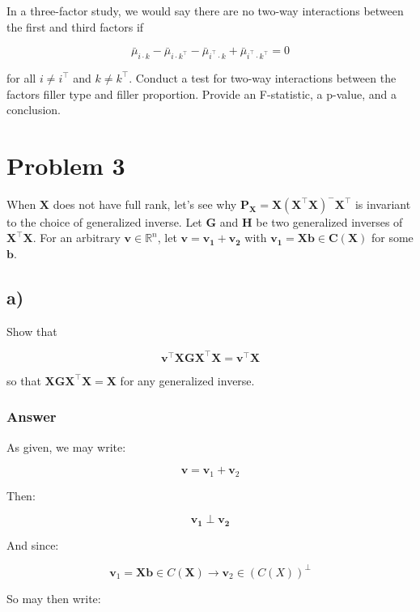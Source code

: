\documentclass[
]{article}
\begin{document}
In a three-factor study, we would say there are no two-way interactions
between the first and third factors if

\[
\bar{\mu}_{i \cdot k} - \bar{\mu}_{i \cdot k^{\top}} - \bar{\mu}_{i^{\top} \cdot k} + \bar{\mu}_{i^{\top} \cdot k^{\top}} = 0
\]

for all \(i \neq i^{\top}\) and \(k \neq k^{\top}\). Conduct a test for
two-way interactions between the factors filler type and filler
proportion. Provide an F-statistic, a p-value, and a conclusion.

\newpage

\section{Problem 3}\label{problem-3}

When \(\boldsymbol{X}\) does not have full rank, let's see why
\(\boldsymbol{P_X = X(X^\top X)^{-}X^\top}\) is invariant to the choice
of generalized inverse. Let \(\boldsymbol{G}\) and \(\boldsymbol{H}\) be
two generalized inverses of \(\boldsymbol{X^\top X}\). For an arbitrary
\(\boldsymbol{v} \in \mathbb{R}^n\), let \(\boldsymbol{v = v_1 + v_2}\)
with \(\boldsymbol{v_1 = Xb \in C(X)}\) for some \(\boldsymbol{b}\).

\subsection{a)}\label{a-2}

Show that

\[
\boldsymbol{v^\top X G X^\top X = v^\top X}
\]

so that \(\boldsymbol{X G X^\top X = X}\) for any generalized inverse.

\subsubsection{Answer}\label{answer}

As given, we may write:

\[
\boldsymbol{v} = \boldsymbol{v}_1 + \boldsymbol{v}_2
\]

Then:

\[
\boldsymbol{v_1} \perp \boldsymbol{v_2}
\]

And since:

\[
\boldsymbol{v}_1 = \boldsymbol{X} \boldsymbol{b} \in C(\boldsymbol{X}) \rightarrow \boldsymbol{v}_2 \in (C(X))^{\perp}
\]

So may then write:
\end{document}
